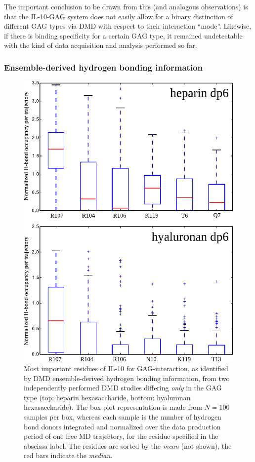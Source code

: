 The important conclusion to be drawn from this (and analogous observations) is
that the IL-10-GAG system does not easily allow for a binary distinction of
different GAG types via DMD with respect to their interaction \enquote{mode}.
Likewise, if there is binding specificity for a certain GAG type, it remained
undetectable with the kind of data acquisition and analysis performed so far.

\subsubsection{Ensemble-derived hydrogen bonding information}

\begin{figure}
\centering
\includegraphics[width=1.0\textwidth]{gfx/dmdil10/round1_il10_hbond_hadp6_vs_hpdp6.pdf}
\caption[]{Most important residues of IL-10 for GAG-interaction, as identified
by DMD ensemble-derived hydrogen bonding information, from two independently
performed DMD studies differing \textit{only} in the GAG type (top: heparin
hexasaccharide, bottom: hyaluronan hexasaccharide). The box plot representation
is made from  $N=100$ samples per box, whereas each sample is the number of
hydrogen bond donors integrated and normalized over the data production period
of one free MD trajectory, for the residue specified in the abscissa label.
The residues are sorted by the \textit{mean} (not shown), the red bars indicate
the \textit{median}.}
\label{fig:dmdil10:hp_hexa_vs_ha_hexa_hbond}
\end{figure}


